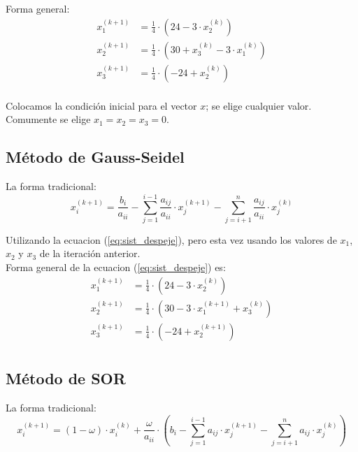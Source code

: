 \documentclass[../main.tex]{subfiles}
\begin{document}
        Forma general:
        \begin{equation}
            \begin{split}
                x_1^{(k+1)} &= \frac{1}{4} \cdot (24 - 3 \cdot x_2^{(k)})\\
                x_2^{(k+1)} &= \frac{1}{4} \cdot (30 + x_3^{(k)} - 3 \cdot x_1^{(k)})\\
                x_3^{(k+1)} &= \frac{1}{4} \cdot (-24 + x_2^{(k)})\\
            \end{split}
        \end{equation}

        Colocamos la condición inicial para el vector $x$; se elige cualquier valor. Comumente se elige $x_1 = x_2 = x_3 = 0$.


    \subsection{Método de Gauss-Seidel}
        La forma tradicional:
        \begin{equation}
            x_{i}^{(k+1)} = \frac{b_i}{a_{ii}} - 
            \sum_{j= 1}^{i-1} \frac{a_{ij}}{a_{ii}} \cdot x_j^{(k+1)}
                -
            \sum_{j= i+1}^{n} \frac{a_{ij}}{a_{ii}} \cdot x_j^{(k)}
        \end{equation}

        Utilizando la ecuacion (\ref{eq:sist_despeje}), pero esta vez usando los valores de $x_1$, $x_2$ y $x_3$ de la iteración anterior.\\

        Forma general de la ecuacion (\ref{eq:sist_despeje}) es:
        \begin{equation}
            \begin{split}
                x_1^{(k+1)} &= \frac{1}{4} \cdot (24 - 3 \cdot x_2^{(k)})\\
                x_2^{(k+1)} &= \frac{1}{4} \cdot (30 - 3 \cdot x_1^{(k+1)} + x_3^{(k)})\\
                x_3^{(k+1)} &= \frac{1}{4} \cdot (-24 + x_2^{(k+1)})\\
            \end{split}
        \end{equation}


    \subsection{Método de SOR}
        La forma tradicional:
        \begin{equation}
            x_{i}^{(k+1)} = (1 - \omega) \cdot x_i^{(k)} + \frac{\omega}{a_{ii}} \cdot \left( b_i - \sum_{j= 1}^{i-1} a_{ij} \cdot x_j^{(k+1)} - \sum_{j= i+1}^{n} a_{ij} \cdot x_j^{(k)} \right)
        \end{equation}
\end{document}
